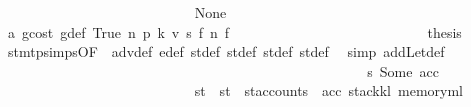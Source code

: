 \begin{isabellebody}
\ \ \ \ \ \ \ \ \ \ \ \ \ \ \ \ \ \ \ \ \ \ \ \ \ \ \isamarkupfalse%
\ None\isanewline
\ \ \ \ \ \ \ \ \ \ \ \ \ \ \ \ \ \ \ \ \ \ \ \ \ \ \isamarkupfalse%
\ a{}\ gcost\ g{\isacharunderscore}{\kern0pt}def\ True\ n{}\ p{}\ k{}\ v{}\ s{}\ f{}\ n{}\ f{}\isanewline
\ \ \ \ \ \ \ \ \ \ \ \ \ \ \ \ \ \ \ \ \ \ \ \ \ \ \isamarkupfalse%
\ {\isacharquery}{\kern0pt}thesis\ \isamarkupfalse%
\ stmt{\isachardot}{\kern0pt}psimps{\isacharparenleft}{\kern0pt}{}{}{\isacharparenright}{\kern0pt}{\isacharbrackleft}{\kern0pt}OF\ {}{}{\isacharparenleft}{\kern0pt}{}{\isacharparenright}{\kern0pt}{\isacharbrackright}{\kern0pt}\ adv{\isacharunderscore}{\kern0pt}def\ e{\isacharprime}{\kern0pt}{\isacharunderscore}{\kern0pt}def\ st{\isacharprime}{\kern0pt}{\isacharunderscore}{\kern0pt}def\ st{\isacharprime}{\kern0pt}{\isacharprime}{\kern0pt}{\isacharunderscore}{\kern0pt}def\ st{\isacharprime}{\kern0pt}{\isacharprime}{\kern0pt}{\isacharprime}{\kern0pt}{\isacharunderscore}{\kern0pt}def\ st{\isacharprime}{\kern0pt}{\isacharprime}{\kern0pt}{\isacharprime}{\kern0pt}{\isacharprime}{\kern0pt}{\isacharunderscore}{\kern0pt}def\ \isamarkupfalse%
\ {\isacharparenleft}{\kern0pt}simp\ add{\isacharcolon}{\kern0pt}Let{\isacharunderscore}{\kern0pt}def{\isacharparenright}{\kern0pt}\isanewline
\ \ \ \ \ \ \ \ \ \ \ \ \ \ \ \ \ \ \ \ \ \ \ \ \isamarkupfalse%
\isanewline
\ \ \ \ \ \ \ \ \ \ \ \ \ \ \ \ \ \ \ \ \ \ \ \ \ \ \isamarkupfalse%
\ s{}{\isacharcolon}{\kern0pt}\ {\isacharparenleft}{\kern0pt}Some\ acc{\isacharparenright}{\kern0pt}\isanewline
\ \ \ \ \ \ \ \ \ \ \ \ \ \ \ \ \ \ \ \ \ \ \ \ \ \ \isamarkupfalse%
\ st{\isacharprime}{\kern0pt}{\isacharprime}{\kern0pt}{\isacharprime}{\kern0pt}{\isacharprime}{\kern0pt}{\isacharprime}{\kern0pt}\ \ {\isachardoublequoteopen}st{\isacharprime}{\kern0pt}{\isacharprime}{\kern0pt}{\isacharprime}{\kern0pt}{\isacharprime}{\kern0pt}{\isacharprime}{\kern0pt}\ {\isacharequal}{\kern0pt}\ st{\isacharprime}{\kern0pt}{\isacharprime}{\kern0pt}{\isacharprime}{\kern0pt}{\isacharprime}{\kern0pt}{\isasymlparr}accounts\ {\isacharcolon}{\kern0pt}{\isacharequal}{\kern0pt}\ acc{\isacharcomma}{\kern0pt}\ stack{\isacharcolon}{\kern0pt}{\isacharequal}{\kern0pt}k\isactrlsub l{\isacharcomma}{\kern0pt}\ memory{\isacharcolon}{\kern0pt}{\isacharequal}{\kern0pt}m\isactrlsub l{\isasymrparr}{\isachardoublequoteclose}\isanewline

\end{isabellebody}

